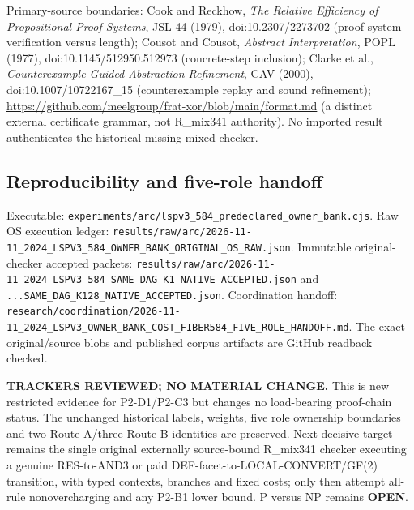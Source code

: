 \documentclass[11pt]{article}
\begin{document}
Primary-source boundaries: Cook and Reckhow, \emph{The Relative Efficiency of Propositional Proof Systems}, JSL 44 (1979), doi:10.2307/2273702 (proof system verification versus length); Cousot and Cousot, \emph{Abstract Interpretation}, POPL (1977), doi:10.1145/512950.512973 (concrete-step inclusion); Clarke et al., \emph{Counterexample-Guided Abstraction Refinement}, CAV (2000), doi:10.1007/10722167\_15 (counterexample replay and sound refinement); \url{https://github.com/meelgroup/frat-xor/blob/main/format.md} (a distinct external certificate grammar, not R_mix341 authority). No imported result authenticates the historical missing mixed checker.

\subsection*{Reproducibility and five-role handoff}
Executable:
\texttt{experiments/arc/lspv3\_584\_predeclared\_owner\_bank.cjs}.
Raw OS execution ledger:
\texttt{results/raw/arc/2026-11-11\_2024\_LSPV3\_584\_OWNER\_BANK\_ORIGINAL\_OS\_RAW.json}.
Immutable original-checker accepted packets:
\texttt{results/raw/arc/2026-11-11\_2024\_LSPV3\_584\_SAME\_DAG\_K1\_NATIVE\_ACCEPTED.json} and
\texttt{...SAME\_DAG\_K128\_NATIVE\_ACCEPTED.json}.
Coordination handoff:
\texttt{research/coordination/2026-11-11\_2024\_LSPV3\_OWNER\_BANK\_COST\_FIBER584\_FIVE\_ROLE\_HANDOFF.md}.
The exact original/source blobs and published corpus artifacts are GitHub readback checked.

\textbf{TRACKERS REVIEWED; NO MATERIAL CHANGE.}
This is new restricted evidence for P2-D1/P2-C3 but changes no load-bearing proof-chain status. The unchanged historical labels, weights, five role ownership boundaries and two Route A/three Route B identities are preserved. Next decisive target remains the single original externally source-bound R_mix341 checker executing a genuine RES-to-AND3 or paid DEF-facet-to-LOCAL-CONVERT/GF(2) transition, with typed contexts, branches and fixed costs; only then attempt all-rule nonovercharging and any P2-B1 lower bound. P versus NP remains \textbf{OPEN}.
\end{document}
